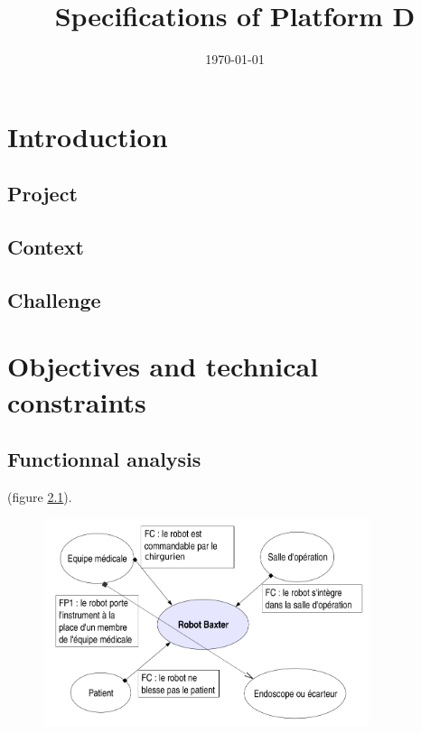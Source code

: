\documentclass[oneside, DIV=11]{scrreprt}
\title{Specifications of Platform D}
\author{}
\date{\today}
\begin{document}


\tableofcontents
\newpage

\chapter{Introduction}

\section{Project}


\section{Context}



\section{Challenge}

\chapter{Objectives and technical constraints}

\section{Functionnal analysis}
 (figure \ref{f1}).

\begin{figure}[h]
\centering
\includegraphics[width=0.85\textwidth]{img/grin2.png}
\caption{}
\label{f1}
\end{figure}



\section{}
\end{document}
